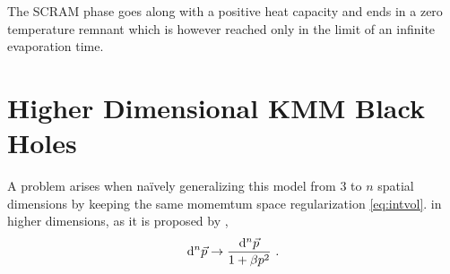 The SCRAM phase goes along with a positive heat capacity
and ends in a zero temperature remnant which is however reached only in the
limit of an infinite evaporation time.



\section{Higher Dimensional KMM Black Holes}\label{sec:lxd-kmm}
A problem arises when naïvely generalizing this model from 3 to $n$ spatial 
dimensions by keeping the same momemtum space regularization \eqref{eq:intvol}.
in higher dimensions, as it is proposed by \cite{KMM95},
\begin{equation}
 \mathrm{d}^n \vec{p} \to \frac{\mathrm{d}^n \vec{p}}{1+\beta p^2}\ .
 \label{eq:kempfextradim}
\end{equation}

